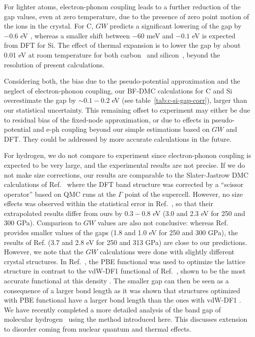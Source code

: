 For lighter atoms, electron-phonon coupling leads to a further reduction of the
gap values, even at zero temperature, due to the presence of zero point motion of the ions in
the crystal. For C, $GW$ predicts a significant lowering of the gap by $-0.6$ eV \cite{Giustino10}, whereas a smaller shift between $-60$ meV \cite{Monserrat14} and $-0.1$ eV \cite{Lautenschlager85} is expected from DFT for Si. The effect of thermal expansion is to lower the gap by about 0.01 eV at room temperature for both carbon~\cite{Monserrat2014,Clark1963} and silicon~\cite{Monserrat2016,Logothetidis1986}, beyond the resolution of present calculations.

Considering both, the bias due to the pseudo-potential approximation and the neglect of 
electron-phonon coupling, our BF-DMC calculations for C and Si overestimate the gap by $\sim 0.1-0.2$ eV
(see table~\ref{tab:c-si-gap-corr}),
larger than our statistical uncertainty. This remaining offset to experiment may
either be due to residual bias of the
fixed-node approximation, or due to effects in pseudo-potential and
e-ph coupling beyond our simple estimations based on $GW$ and DFT.
They could be addressed by more accurate calculations in the future.

For hydrogen, we do not compare to experiment since electron-phonon coupling is
expected to be very large, and the experimental results are not precise.
If we do not make  size corrections, our results are comparable to the Slater-Jastrow DMC calculations of Ref.~\cite{Azadi2017}
where the DFT band structure was corrected by a ``scissor operator'' based on QMC runs at the $\Gamma$ point of the supercell. However, no size effects was observed within the statistical
error in Ref.~\cite{Azadi2017}, so that their extrapolated results differ from ours
by $0.3-0.8$ eV (3.0 and 2.3 eV for 250 and 300 GPa).
Comparison to $GW$ values are also
not conclusive: 
whereas Ref.~\cite{Lebegue2012} provides smaller values of the gaps (1.8 and 1.0 eV for 250 and 300 GPa), the results  of Ref. \cite{McMinis2015} (3.7 and 2.8 eV for 250 and 313 GPa)  are close to our predictions.
However, we note that  the $GW$ calculations were done with
slightly different crystal structures.
In Ref.~\cite{Lebegue2012}, the PBE functional was used to optimize the lattice structure
in contrast to the vdW-DF1 functional of Ref.~\cite{McMinis2015}, shown to be the most accurate functional at this density \cite{Clay2014}. The smaller gap can then
be seen as a consequence of  a larger bond length as it was shown that structures optimized with PBE functional have a larger bond length than the ones with vdW-DF1 \cite{McMinis2015}.
We have recently completed a more detailed analysis of the band gap of molecular hydrogen~\cite{Gorelov2019} using the method introduced here. This discusses extension to disorder coming from nuclear quantum and thermal effects.

